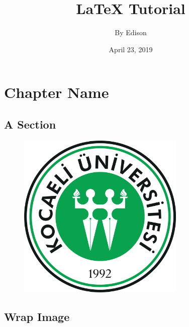\documentclass[a4paper,12pt]{book}
\begin{document}
\title{\Large{\textbf{LaTeX Tutorial}}}
\author{By Edison}
\date{April 23, 2019}

\maketitle
\let\cleardoublepage\clearpage
\tableofcontents

\setcounter{page}{2}

\chapter{Chapter Name}

\blindmathtrue
\blindtext[5]

\section{A Section}
\begin{figure}[ht]
    \centering

    \includegraphics[width=8cm]{pic.png}
\end{figure}
\blindtext
\newpage

\section*{Wrap Image}
\begingroup
\setlength{\intextsep}{0pt}
\setlength{\columnsep}{15pt}
\end{document}
